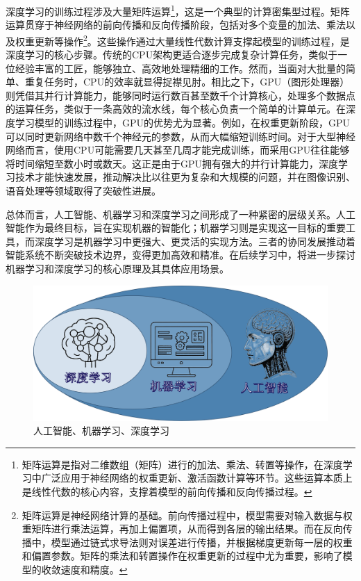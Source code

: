 深度学习的训练过程涉及大量矩阵运算\footnote{矩阵运算是指对二维数组（矩阵）进行的加法、乘法、转置等操作，在深度学习中广泛应用于神经网络的权重更新、激活函数计算等环节。这些运算本质上是线性代数的核心内容，支撑着模型的前向传播和反向传播过程。}，这是一个典型的计算密集型过程。矩阵运算贯穿于神经网络的前向传播和反向传播阶段，包括对多个变量的加法、乘法以及权重更新等操作\footnote{矩阵运算是神经网络计算的基础。前向传播过程中，模型需要对输入数据与权重矩阵进行乘法运算，再加上偏置项，从而得到各层的输出结果。而在反向传播中，模型通过链式求导法则对误差进行传播，并根据梯度更新每一层的权重和偏置参数。矩阵的乘法和转置操作在权重更新的过程中尤为重要，影响了模型的收敛速度和精度。}。这些操作通过大量线性代数计算支撑起模型的训练过程，是深度学习的核心步骤。传统的CPU架构更适合逐步完成复杂计算任务，类似于一位经验丰富的工匠，能够独立、高效地处理精细的工作。然而，当面对大批量的简单、重复任务时，CPU的效率就显得捉襟见肘。相比之下，GPU（图形处理器）则凭借其并行计算能力，能够同时运行数百甚至数千个计算核心，处理多个数据点的运算任务，类似于一条高效的流水线，每个核心负责一个简单的计算单元。在深度学习模型的训练过程中，GPU的优势尤为显著。例如，在权重更新阶段，GPU可以同时更新网络中数千个神经元的参数，从而大幅缩短训练时间。对于大型神经网络而言，使用CPU可能需要几天甚至几周才能完成训练，而采用GPU往往能够将时间缩短至数小时或数天。这正是由于GPU拥有强大的并行计算能力，深度学习技术才能快速发展，推动解决比以往更为复杂和大规模的问题，并在图像识别、语音处理等领域取得了突破性进展。

总体而言，人工智能、机器学习和深度学习之间形成了一种紧密的层级关系。人工智能作为最终目标，旨在实现机器的智能化；机器学习则是实现这一目标的重要工具，而深度学习是机器学习中更强大、更灵活的实现方法。三者的协同发展推动着智能系统不断突破技术边界，变得更加高效和精准。在后续学习中，将进一步探讨机器学习和深度学习的核心原理及其具体应用场景。

\begin{figure}[H]
	\centering
	\includegraphics[width=0.9\linewidth]{image/2/人工智能、机器学习、深度学习.png}
	\caption{人工智能、机器学习、深度学习}
\end{figure}

